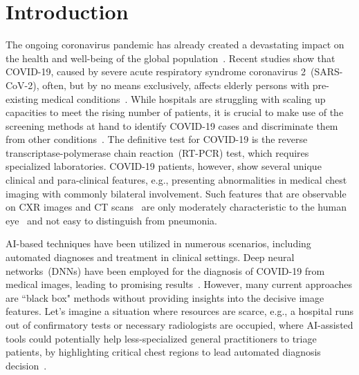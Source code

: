 \documentclass[conference]{IEEEtran}
\begin{document}
\section{Introduction}
\label{introduction}
The ongoing coronavirus pandemic%
has already created a devastating impact on the health and well-being of the global population~\cite{wang2020covid,gozes2020rapid}. 
Recent studies show that COVID-19, caused by severe acute respiratory syndrome coronavirus 2~(SARS-CoV-2), often, but by no means exclusively, affects elderly persons with pre-existing medical conditions~\cite{COVID1,COVID2,COVID3,huang2020clinical,ng2020imaging}.
While hospitals are struggling with scaling up capacities to meet the rising number of patients, it is crucial to make use of the screening methods at hand to identify COVID-19 cases and discriminate them from other conditions~\cite{wang2020covid}. 
The definitive test for COVID-19 is the reverse transcriptase-polymerase chain reaction~(RT-PCR) test, which requires specialized laboratories. COVID-19 patients, however, show several unique clinical and para-clinical features, e.g., presenting abnormalities in medical chest imaging with commonly bilateral involvement. Such features that are observable on CXR images and CT scans~\cite{huang2020clinical} are only moderately characteristic to the human eye~\cite{ng2020imaging} and not easy to distinguish from pneumonia. 

AI-based techniques have been utilized in numerous scenarios, including automated diagnoses and treatment in clinical settings. Deep neural networks~(DNNs) have been employed for the diagnosis of COVID-19 from medical images, leading to promising results~\cite{huang2020clinical,wang2020covid,ng2020imaging,ozturk2020automated,tabik2020covidgr}. However, many current approaches are ``black box" methods without providing insights into the decisive image features. 
Let's imagine a situation where resources are scarce, e.g., a hospital runs out of confirmatory tests or necessary radiologists are occupied, where AI-assisted tools could potentially help less-specialized general practitioners to triage patients, by highlighting critical chest regions to lead automated diagnosis decision~\cite{wang2020covid}. 
\end{document}
